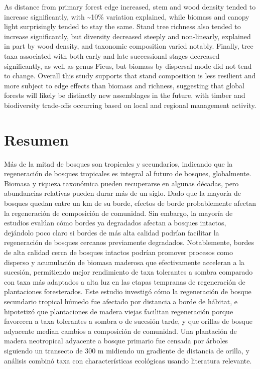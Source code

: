 \documentclass[
  12pt,
]{article}
\begin{document}
As distance from primary forest edge increased, stem and wood density tended to increase significantly, with \textasciitilde10\% variation explained, while biomass and canopy light surprisingly tended to stay the same.
Stand tree richness also tended to increase significantly, but diversity decreased steeply and non-linearly, explained in part by wood density, and taxonomic composition varied notably.
Finally, tree taxa associated with both early and late successional stages decreased significantly, as well as genus Ficus, but biomass by dispersal mode did not tend to change.
Overall this study supports that stand composition is less resilient and more subject to edge effects than biomass and richness, suggesting that global forests will likely be distinctly new assemblages in the future, with timber and biodiversity trade-offs occurring based on local and regional management activity.

\newpage

\hypertarget{resumen}{%
\section*{Resumen}\label{resumen}}

Más de la mitad de bosques son tropicales y secundarios, indicando que la regeneración de bosques tropicales es integral al futuro de bosques, globalmente.
Biomasa y riqueza taxonómica pueden recuperarse en algunas décadas, pero abundancias relativas pueden durar más de un siglo.
Dado que la mayoría de bosques quedan entre un km de su borde, efectos de borde probablemente afectan la regeneración de composición de comunidad.
Sin embargo, la mayoría de estudios evalúan cómo bordes ya degradados afectan a bosques intactos, dejándolo poco claro si bordes de más alta calidad podrían facilitar la regeneración de bosques cercanos previamente degradados.
Notablemente, bordes de alta calidad cerca de bosques intactos podrían promover procesos como disperso y acumulación de biomasa maderosa que efectivamente acceleran a la sucesión, permitiendo mejor rendimiento de taxa tolerantes a sombra comparado con taxa más adaptados a alta luz en las etapas tempranas de regeneración de plantaciones foresterados.
Este estudio investigó cómo la regeneración de bosque secundario tropical húmedo fue afectado por distancia a borde de hábitat, e hipotetizó que plantaciones de madera viejas facilitan regeneración porque favorecen a taxa tolerantes a sombra o de sucesión tarde, y que orillas de bosque adyacente median cambios a composición de comunidad.
Una plantación de madera neotropical adyacente a bosque primario fue censada por árboles siguiendo un transecto de 300 m midiendo un gradiente de distancia de orilla, y análisis combinó taxa con characterísticas ecológicas usando literatura relevante.
\end{document}
